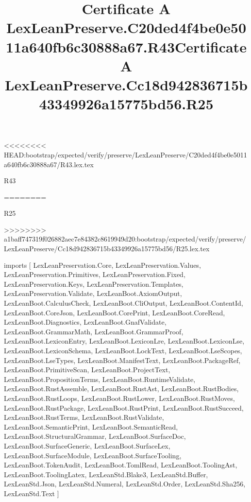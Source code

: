 <<<<<<<< HEAD:bootstrap/expected/verify/preserve/LexLeanPreserve/C20ded4f4be0e5011a640fb6c30888a67/R43.lex.tex
\begin{lexlean}{R43}
\title{Certificate A LexLeanPreserve.C20ded4f4be0e5011a640fb6c30888a67.R43}
========
\begin{lexlean}{R25}
\title{Certificate A LexLeanPreserve.Cc18d942836715b43349926a15775bd56.R25}
>>>>>>>> a1baff747319f026882aec7e84382c8619949d20:bootstrap/expected/verify/preserve/LexLeanPreserve/Cc18d942836715b43349926a15775bd56/R25.lex.tex
\begin{coremodule}
imports [
  LexLeanPreservation.Core,
  LexLeanPreservation.Values,
  LexLeanPreservation.Primitives,
  LexLeanPreservation.Fixed,
  LexLeanPreservation.Keys,
  LexLeanPreservation.Templates,
  LexLeanPreservation.Validate,
  LexLeanBoot.AxiomOutput,
  LexLeanBoot.CalculusCheck,
  LexLeanBoot.CliOutput,
  LexLeanBoot.ContentId,
  LexLeanBoot.CoreJson,
  LexLeanBoot.CorePrint,
  LexLeanBoot.CoreRead,
  LexLeanBoot.Diagnostics,
  LexLeanBoot.GnafValidate,
  LexLeanBoot.GrammarMath,
  LexLeanBoot.GrammarProof,
  LexLeanBoot.LexiconEntry,
  LexLeanBoot.LexiconLre,
  LexLeanBoot.LexiconLse,
  LexLeanBoot.LexiconSchema,
  LexLeanBoot.LockText,
  LexLeanBoot.LseScopes,
  LexLeanBoot.LseTypes,
  LexLeanBoot.ManifestText,
  LexLeanBoot.PackageRef,
  LexLeanBoot.PrimitiveScan,
  LexLeanBoot.ProjectText,
  LexLeanBoot.PropositionTerms,
  LexLeanBoot.RuntimeValidate,
  LexLeanBoot.RustAssemble,
  LexLeanBoot.RustAst,
  LexLeanBoot.RustBodies,
  LexLeanBoot.RustLoops,
  LexLeanBoot.RustLower,
  LexLeanBoot.RustMoves,
  LexLeanBoot.RustPackage,
  LexLeanBoot.RustPrint,
  LexLeanBoot.RustSucceed,
  LexLeanBoot.RustTerms,
  LexLeanBoot.RustValidate,
  LexLeanBoot.SemanticPrint,
  LexLeanBoot.SemanticRead,
  LexLeanBoot.StructuralGrammar,
  LexLeanBoot.SurfaceDoc,
  LexLeanBoot.SurfaceGeneric,
  LexLeanBoot.SurfaceLex,
  LexLeanBoot.SurfaceModule,
  LexLeanBoot.SurfaceTooling,
  LexLeanBoot.TokenAudit,
  LexLeanBoot.TomlRead,
  LexLeanBoot.ToolingAst,
  LexLeanBoot.ToolingLatex,
  LexLeanStd.Blake3,
  LexLeanStd.Buffer,
  LexLeanStd.Json,
  LexLeanStd.Numeral,
  LexLeanStd.Order,
  LexLeanStd.Sha256,
  LexLeanStd.Text
]


\end{coremodule}
\end{lexlean}
\end{lexlean}
